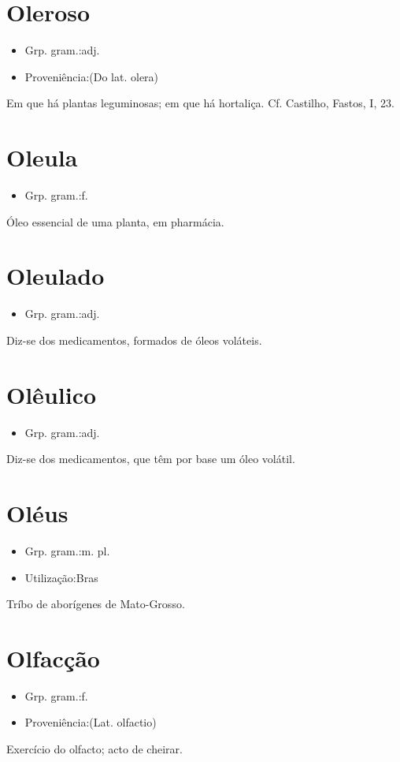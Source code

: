 \section{Oleroso}
\begin{itemize}
\item {Grp. gram.:adj.}
\end{itemize}
\begin{itemize}
\item {Proveniência:(Do lat. \textunderscore olera\textunderscore )}
\end{itemize}
Em que há plantas leguminosas; em que há hortaliça. Cf. Castilho, \textunderscore Fastos\textunderscore , I, 23.
\section{Oleula}
\begin{itemize}
\item {Grp. gram.:f.}
\end{itemize}
Óleo essencial de uma planta, em pharmácia.
\section{Oleulado}
\begin{itemize}
\item {Grp. gram.:adj.}
\end{itemize}
Diz-se dos medicamentos, formados de óleos voláteis.
\section{Olêulico}
\begin{itemize}
\item {Grp. gram.:adj.}
\end{itemize}
Diz-se dos medicamentos, que têm por base um óleo volátil.
\section{Oléus}
\begin{itemize}
\item {Grp. gram.:m. pl.}
\end{itemize}
\begin{itemize}
\item {Utilização:Bras}
\end{itemize}
Tríbo de aborígenes de Mato-Grosso.
\section{Olfacção}
\begin{itemize}
\item {Grp. gram.:f.}
\end{itemize}
\begin{itemize}
\item {Proveniência:(Lat. \textunderscore olfactio\textunderscore )}
\end{itemize}
Exercício do olfacto; acto de cheirar.
